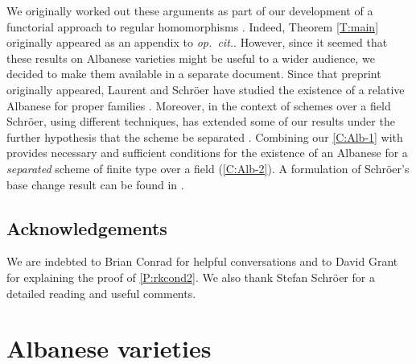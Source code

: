 \documentclass[11pt, reqno]{amsart}
\numberwithin{equation}{section}
\theoremstyle{definition}
\theoremstyle{remark}
\begin{document}
      

 \medskip 
 
 We originally worked out these arguments as part of our development
 of a functorial approach to regular homomorphisms \cite{ACMVfunctor}.
 Indeed, Theorem \ref{T:main} originally appeared as an appendix to
 \emph{op.~cit.}.  However, since it seemed that these results on
 Albanese varieties might be useful to a wider audience, we decided to
 make them available in a separate document.  Since that preprint
 originally appeared, Laurent and Schr\"oer have studied the existence
 of a relative Albanese for proper families \cite{laurentschroeralbanese}. Moreover, in
 the context of schemes over a field Schr\"oer,
 using different techniques, has extended some of our results under
 the further hypothesis that the scheme be separated \cite{schroeralbanese}.  Combining our
 \ref{C:Alb-1} with \cite[Thm.~p.2]{schroeralbanese}
 provides necessary and sufficient conditions for the existence of an
 Albanese for a \emph{separated} scheme of finite type over a field
 (\ref{C:Alb-2}).  A formulation of Schr\"oer's base
 change result \cite[Thm.~p.4]{schroeralbanese} can be found in
 .
    


          



\subsection*{Acknowledgements}
We are indebted to Brian Conrad for helpful
conversations and to David Grant for explaining the proof of 
\ref{P:rkcond2}.  We also thank Stefan Schr\"oer for a
detailed reading and useful comments.


 \section{Albanese varieties}\label{S:AlbaneseDef}
\end{document}
